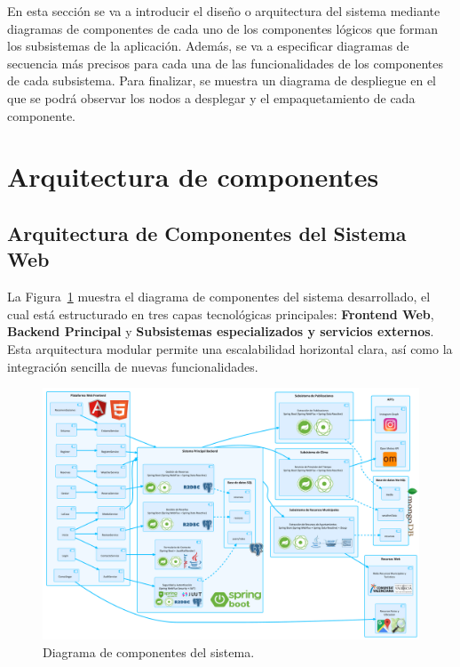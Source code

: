 

En esta sección se va a introducir el diseño o arquitectura del sistema mediante diagramas
de componentes de cada uno de los componentes lógicos que forman los subsistemas
de la aplicación. Además, se va a especificar diagramas de secuencia más precisos para
cada una de las funcionalidades de los componentes de cada subsistema. Para finalizar, se muestra un diagrama
de despliegue en el que se podrá observar los nodos a desplegar y el empaquetamiento de cada
componente.

\section{Arquitectura de componentes}

\subsection{Arquitectura de Componentes del Sistema Web}
La Figura~\ref{fig:componentes_sistema} muestra el diagrama de componentes del sistema desarrollado, el cual está estructurado en tres capas tecnológicas principales: \textbf{Frontend Web}, \textbf{Backend Principal} y \textbf{Subsistemas especializados y servicios externos}. Esta arquitectura modular permite una escalabilidad horizontal clara, así como la integración sencilla de nuevas funcionalidades.

\begin{figure}
    \centering
    \includegraphics[width=0.95\textheight]{figs/arquitectura.pdf}
    \caption{Diagrama de componentes del sistema.\label{fig:componentes_sistema}}
\end{figure}


